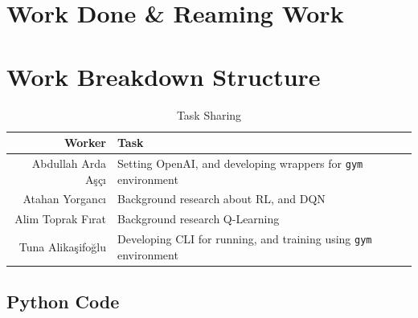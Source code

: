 \documentclass[a4paper, 12pt, conference]{IEEEtran}
\begin{document}
\section{Work Done \& Reaming Work}


\section{Work Breakdown Structure}
\begin{table}[h]
    \centering
    \label{tab:task_sharing}
    \caption{Task Sharing}
    \begin{tabular}{rl}\toprule
        \textbf{Worker} & \textbf{Task}\\\midrule
        Abdullah Arda Aşçı & Setting OpenAI, and developing wrappers for \verb+gym+ environment\\
        Atahan Yorgancı & Background research about RL, and DQN\\
        Alim Toprak Fırat & Background research Q-Learning\\
        Tuna Alikaşifoğlu & Developing CLI for running, and training using \verb+gym+ environment\\ \bottomrule
    \end{tabular}
\end{table}

\printbibliography{}

\begin{appendices}
    \onecolumn
    \section{Python Code}
    \inputminted[linenos, fontsize=\scriptsize]{python}{../src/main.py}
\end{appendices}
\end{document}
